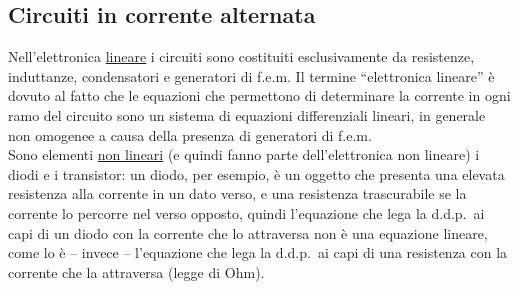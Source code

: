\subsection{Circuiti in corrente alternata}

Nell'elettronica \underline{lineare} i circuiti sono costituiti esclusivamente
da resistenze, induttanze, condensatori e generatori di f.e.m. Il termine
``elettronica lineare'' \`e dovuto al fatto che le equazioni che permettono di
determinare la corrente in ogni ramo del circuito sono un sistema di equazioni
differenziali lineari, in generale non omogenee a causa della presenza di
generatori di f.e.m.\\
Sono elementi \underline{non lineari} (e quindi fanno parte dell'elettronica non
lineare) i diodi e i transistor: un diodo, per esempio, \`e un oggetto che
presenta una elevata resistenza alla corrente in un dato verso, e una resistenza
trascurabile se la corrente lo percorre nel verso opposto, quindi l'equazione
che lega la d.d.p.\ ai capi di un diodo con la corrente che lo attraversa non
\`e una equazione lineare, come lo \`e -- invece -- l'equazione che lega la
d.d.p.\ ai capi di una resistenza con la corrente che la attraversa (legge di
Ohm).

